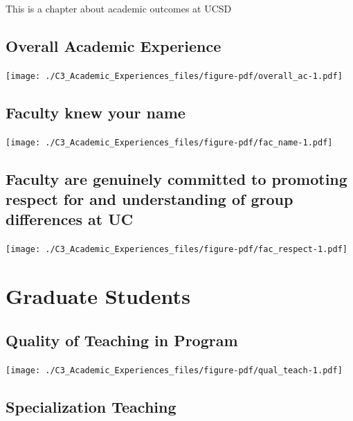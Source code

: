 \documentclass[
  letterpaper,
  DIV=11,
  numbers=noendperiod]{scrreprt}
\begin{document}
This is a chapter about academic outcomes at UCSD

\hypertarget{overall-academic-experience}{%
\subsection{Overall Academic
Experience}\label{overall-academic-experience}}

\texttt{[image: ./C3\_Academic\_Experiences\_files/figure-pdf/overall\_ac-1.pdf]}

\hypertarget{faculty-knew-your-name}{%
\subsection{Faculty knew your name}\label{faculty-knew-your-name}}

\texttt{[image: ./C3\_Academic\_Experiences\_files/figure-pdf/fac\_name-1.pdf]}

\hypertarget{faculty-are-genuinely-committed-to-promoting-respect-for-and-understanding-of-group-differences-at-uc}{%
\subsection{Faculty are genuinely committed to promoting respect for and
understanding of group differences at
UC}\label{faculty-are-genuinely-committed-to-promoting-respect-for-and-understanding-of-group-differences-at-uc}}

\texttt{[image: ./C3\_Academic\_Experiences\_files/figure-pdf/fac\_respect-1.pdf]}

\hypertarget{graduate-students-2}{%
\section{Graduate Students}\label{graduate-students-2}}

\hypertarget{quality-of-teaching-in-program}{%
\subsection{Quality of Teaching in
Program}\label{quality-of-teaching-in-program}}

\texttt{[image: ./C3\_Academic\_Experiences\_files/figure-pdf/qual\_teach-1.pdf]}

\hypertarget{specialization-teaching}{%
\subsection{Specialization Teaching}\label{specialization-teaching}}
\end{document}

